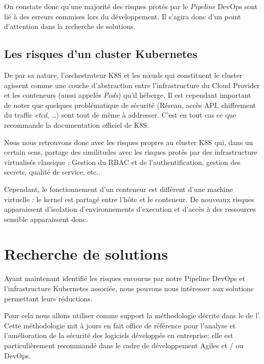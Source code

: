 On constate donc qu'une majorité des risques protés par le \emph{Pipeline} DevOps sont lié à des erreurs commises lors
du développement. Il s'agira donc d'un point d'attention dans la recherche de solutions.

\subsection{Les risques d'un cluster Kubernetes}
De par sa nature, l'orchestrateur \ac{K8S} et les nœuds qui constituent le cluster agissent comme une couche 
d'abstraction entre l'infrastructure du Cloud Provider et les conteneurs (aussi appelés \emph{Pods}) qu'il héberge.
\newline Il est cependant important de noter que quelques problématique de sécurité (\eg Réseau, accès API, chiffrement 
du traffic \emph{etcd}, \dots) sont tout de même à addresser. C'est en tout cas ce que recommande la documentation 
officiel de \ac{K8S}\autocite{k8s_security_2021}.

Nous nous retrouvons donc avec les risques propres au cluster \ac{K8S} qui, dans un certain sens, partage des similitudes
avec les risques protés par des infrastructure virtualisés classique : Gestion du \ac{RBAC} et de l'authentification, 
gestion des secrets, qualité de service, etc..

Cependant, le fonctionnement d'un conteneur est différent d'une machine virtuelle : le kernel est partagé entre l'hôte et
le conteneur. De nouveaux risques apparaissent d'isolation d'environnements d'execution et d'accès à des ressources 
sensible apparaissent donc. 

\newpage

\section{Recherche de solutions}

Ayant maintenant identifié les risques encourus par notre Pipeline DevOps et l'infrastructure Kubernetes associée,
nous pouvons nous intéresser aux solutions permettant leurs réductions.

Pour cela nous allons utiliser comme support la méthodologie décrite dans le 
\autocite{samm_v2.0_owasp_project_2021}
de l'\citeauthor{samm_v2.0_owasp_project_2021}. Cette méthodologie mit à jours en 
fait office de référence pour l'analyse et l'amélioration de la sécurité des logiciels développés en entreprise; elle est
particulièrement recommandé dans le cadre de développement Agiles et / ou DevOps.

